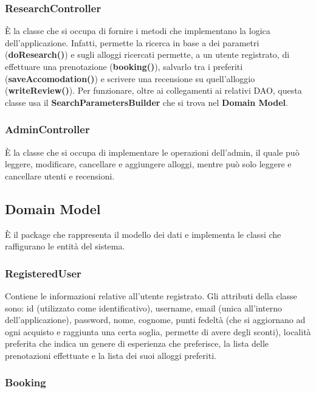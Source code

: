\documentclass[10pt]{article}
\begin{document}
\subsubsection{ResearchController}

\`E la classe che si occupa di fornire i metodi che implementano la logica dell'applicazione. Infatti, permette la ricerca in base a dei parametri (\textbf{doResearch()}) e sugli alloggi ricercati permette, a un utente registrato, di effettuare una prenotazione (\textbf{booking()}), salvarlo tra i preferiti (\textbf{saveAccomodation()}) e scrivere una recensione su quell'alloggio (\textbf{writeReview()}). Per funzionare, oltre ai collegamenti ai relativi DAO, questa classe usa il \textbf{SearchParametersBuilder} che si trova nel \textbf{Domain Model}.

\subsubsection{AdminController}

\`E la classe che si occupa di implementare le operazioni dell'admin, il quale pu\`o leggere, modificare, cancellare e aggiungere alloggi, mentre pu\`o solo leggere e cancellare utenti e recensioni.
 
\subsection{Domain Model}

\`E il package che rappresenta il modello dei dati e implementa le classi che raffigurano le entit\`a del sistema.

\subsubsection{RegisteredUser}

Contiene le informazioni relative all'utente registrato. Gli attributi della classe sono: id (utilizzato come identificativo), username, email (unica all'interno dell'applicazione), password, nome, cognome, punti fedelt\`a (che si aggiornano ad ogni acquisto e raggiunta una certa soglia, permette di avere degli sconti), localit\`a preferita che indica un genere di esperienza che preferisce, la lista delle prenotazioni effettuate e la lista dei suoi alloggi preferiti. 

\subsubsection{Booking}
\end{document}
